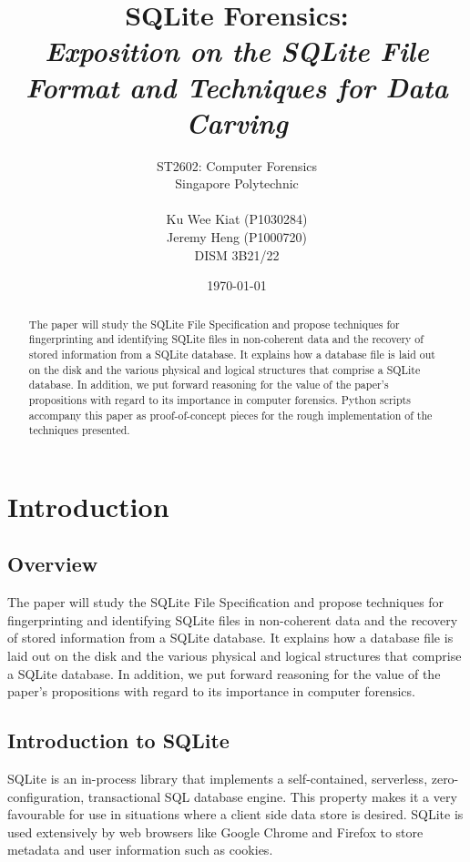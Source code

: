 \documentclass{article}
\begin{document}
\title{SQLite Forensics:\\\emph{Exposition on the SQLite File Format and Techniques for Data Carving}}
\date{\today}
\author{ST2602: Computer Forensics\\Singapore Polytechnic\\\\Ku Wee Kiat (P1030284)\\Jeremy Heng (P1000720)\\DISM 3B21/22}
\maketitle

\vfill
\begin{abstract}
The paper will study the SQLite File Specification and propose techniques for fingerprinting and identifying SQLite files in non-coherent data and the recovery of stored information from a SQLite database. It explains how a database file is laid out on the disk and the various physical and logical structures that comprise a SQLite database. In addition, we put forward reasoning for the value of the paper's propositions with regard to its importance in computer forensics. Python scripts accompany this paper as proof-of-concept pieces for the rough implementation of the techniques presented.
\end{abstract}

\pagebreak

\setcounter{tocdepth}{4}
\tableofcontents

\pagebreak
\section{Introduction}

\subsection{Overview}
The paper will study the SQLite File Specification and propose techniques for fingerprinting and identifying SQLite files in non-coherent data and the recovery of stored information from a SQLite database. It explains how a database file is laid out on the disk and the various physical and logical structures that comprise a SQLite database. In addition, we put forward reasoning for the value of the paper's propositions with regard to its importance in computer forensics.

\subsection{Introduction to SQLite}
SQLite is an in-process library that implements a self-contained, serverless, zero-configuration, transactional SQL database engine. This property makes it a very favourable for use in situations where a client side data store is desired. SQLite is used extensively by web browsers like Google Chrome and Firefox to store metadata and user information such as cookies. 
\end{document}
